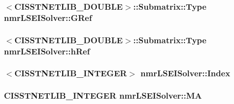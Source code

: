 \hypertarget{classnmr_l_s_e_i_solver_ac4742f5e6f42cd0cc63f00b70a26a84f}{
\subsubsection[{G\-Ref}]{$<$C\-I\-S\-S\-T\-N\-E\-T\-L\-I\-B\-\_\-\-D\-O\-U\-B\-L\-E$>$\-::Submatrix\-::\-Type nmr\-L\-S\-E\-I\-Solver\-::\-G\-Ref\hspace{0.3cm}{\ttfamily [protected]}}}\label{classnmr_l_s_e_i_solver_ac4742f5e6f42cd0cc63f00b70a26a84f}
\hypertarget{classnmr_l_s_e_i_solver_a36515975cc4d9e31a1f44a9c008e5c3a}{
\subsubsection[{h\-Ref}]{$<$C\-I\-S\-S\-T\-N\-E\-T\-L\-I\-B\-\_\-\-D\-O\-U\-B\-L\-E$>$\-::Submatrix\-::\-Type nmr\-L\-S\-E\-I\-Solver\-::h\-Ref\hspace{0.3cm}{\ttfamily [protected]}}}\label{classnmr_l_s_e_i_solver_a36515975cc4d9e31a1f44a9c008e5c3a}
\hypertarget{classnmr_l_s_e_i_solver_a1cc899c7154c60c279bfa6ffe2f836a3}{
\subsubsection[{Index}]{$<$C\-I\-S\-S\-T\-N\-E\-T\-L\-I\-B\-\_\-\-I\-N\-T\-E\-G\-E\-R$>$ nmr\-L\-S\-E\-I\-Solver\-::\-Index\hspace{0.3cm}{\ttfamily [protected]}}}\label{classnmr_l_s_e_i_solver_a1cc899c7154c60c279bfa6ffe2f836a3}
\hypertarget{classnmr_l_s_e_i_solver_a1cb20a6323aad18c24b11714180e21a6}{
\subsubsection[{M\-A}]{\setlength{\rightskip}{0pt plus 5cm}C\-I\-S\-S\-T\-N\-E\-T\-L\-I\-B\-\_\-\-I\-N\-T\-E\-G\-E\-R nmr\-L\-S\-E\-I\-Solver\-::\-M\-A\hspace{0.3cm}{\ttfamily [protected]}}}\label{classnmr_l_s_e_i_solver_a1cb20a6323aad18c24b11714180e21a6}
